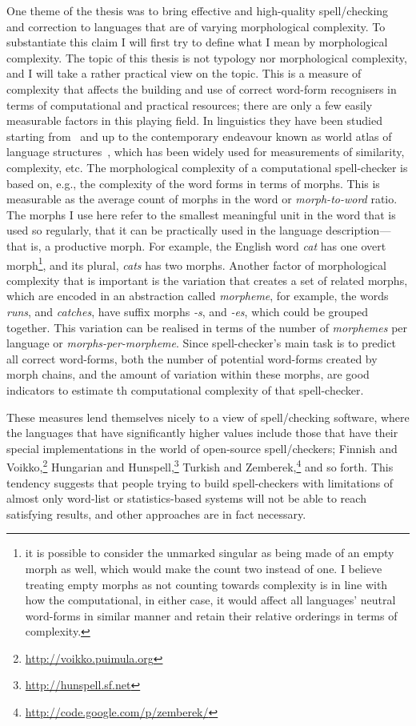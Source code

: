 \documentclass[officiallayout,final]{unihelcompling}
\begin{document}
One theme of the thesis was to bring effective and high-quality
spell\-/checking and correction to languages that are of varying
\gls{morphological complexity}.  To substantiate this claim I will first try to
define what I mean by morphological complexity.  The topic of this thesis is
not typology nor morphological complexity, and I will take a rather practical
view on the topic.  This is a measure of complexity that affects the building
and use of correct word-form recognisers in terms of computational and
practical resources; there are only a few easily measurable factors in this
playing field. In linguistics they have been studied starting
from~\citet{greenberg1960quantitative} and up to the contemporary endeavour
known as world atlas of language structures~\citep{wals}, which has been widely
used for measurements of similarity, complexity, etc.  The morphological
complexity of a computational spell-checker is based on, e.g., the complexity
of the word forms in terms of \glspl{morph}.  This is measurable as the average
count of morphs in the word or \emph{morph-to-word} ratio. The morphs I use
here refer to the smallest meaningful unit in the word that is used so
regularly, that it can be practically used in the language description---that
is, a productive morph. For example, the English word \emph{cat} has one overt
morph\footnote{it is possible to consider the unmarked singular as being made
    of an empty morph as well, which would make the count two instead of one. I
    believe treating empty morphs as not counting towards complexity is in line
    with how the computational, in either case, it would affect all languages'
neutral word-forms in similar manner and retain their relative orderings in
terms of complexity.}, and its plural, \emph{cats} has two morphs.  Another
factor of morphological complexity that is important is the variation that
creates a set of related morphs, which are encoded in an abstraction called
\emph{morpheme}, for example, the words \emph{runs}, and \emph{catches}, have
suffix morphs \emph{-s}, and \emph{-es}, which could be grouped together. This
variation can be realised in terms of the number of \emph{morphemes} per
language or \emph{morphs-per-morpheme}. Since spell-checker's main task is to
predict all correct word-forms, both the number of potential word-forms created
by morph chains, and the amount of variation within these morphs, are good
indicators to estimate th computational complexity of that spell-checker.

These measures lend themselves nicely to a view of spell\-/checking
software, where the languages that have significantly higher values 
include those that have their special implementations in the
world of open-source spell\-/checkers; Finnish and
Voikko,\footnote{\url{http://voikko.puimula.org}} Hungarian and
Hunspell,\footnote{\url{http://hunspell.sf.net}} Turkish and
Zemberek,\footnote{\url{http://code.google.com/p/zemberek/}} and so forth.
This tendency suggests that people trying to build spell-checkers with
limitations of almost only word-list or statistics-based systems will not be
able to reach satisfying results, and other approaches are in fact necessary.
\end{document}

